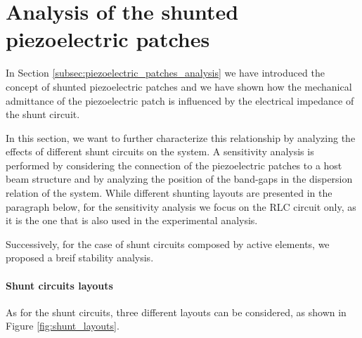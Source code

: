 \section{Analysis of the shunted piezoelectric patches}
\label{sec:analysis_shunted_piezo}

In Section \ref{subsec:piezoelectric_patches_analysis} we have introduced the concept of shunted piezoelectric patches and we have shown how the mechanical admittance of the piezoelectric patch is influenced by the electrical impedance of the shunt circuit.

In this section, we want to further characterize this relationship by analyzing the effects of different shunt circuits on the system.
A sensitivity analysis is performed by considering the connection of the piezoelectric patches to a host beam structure and by analyzing the position of the band-gaps in the dispersion relation of the system.
While different shunting layouts are presented in the paragraph below, for the sensitivity analysis we focus on the RLC circuit only, as it is the one that is also used in the experimental analysis.

Successively, for the case of shunt circuits composed by active elements, we proposed a breif stability analysis.


\paragraph{Shunt circuits layouts}

As for the shunt circuits, three different layouts can be considered, as shown in Figure \ref{fig:shunt_layouts}.


